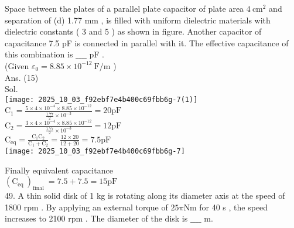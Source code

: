 \documentclass[10pt]{article}
\begin{document}
Space between the plates of a parallel plate capacitor of plate area \(4 \mathrm{~cm}^{2}\) and separation of (d) 1.77 mm , is filled with uniform dielectric materials with dielectric constants ( 3 and 5 ) as shown in figure. Another capacitor of capacitance 7.5 pF is connected in parallel with it. The effective capacitance of this combination is \(\_\_\_\_\) pF .\\
(Given \(\varepsilon_{0}=8.85 \times 10^{-12} \mathrm{~F} / \mathrm{m}\) )\\
Ans. (15)\\
Sol.\\
\texttt{[image: 2025\_10\_03\_f92ebf7e4b400c69fbb6g-7(1)]}\\
\(\mathrm{C}_{1}=\frac{5 \times 4 \times 10^{-4} \times 8.85 \times 10^{-12}}{\frac{1.77}{2} \times 10^{-3}}=20 \mathrm{pF}\)\\
\(\mathrm{C}_{2}=\frac{3 \times 4 \times 10^{-4} \times 8.85 \times 10^{-12}}{\frac{1.77}{2} \times 10^{-3}}=12 \mathrm{pF}\)\\
\(\mathrm{C}_{\mathrm{eq}}=\frac{\mathrm{C}_{1} \mathrm{C}_{2}}{\mathrm{C}_{1}+\mathrm{C}_{2}}=\frac{12 \times 20}{12+20}=7.5 \mathrm{pF}\)\\
\texttt{[image: 2025\_10\_03\_f92ebf7e4b400c69fbb6g-7]}

Finally equivalent capacitance\\
\(\left(\mathrm{C}_{\text {eq }}\right)_{\text {final }}=7.5+7.5=15 \mathrm{pF}\)\\
49. A thin solid disk of 1 kg is rotating along its diameter axis at the speed of 1800 rpm . By applying an external torque of \(25 \pi \mathrm{Nm}\) for 40 s , the speed increases to 2100 rpm . The diameter of the disk is \(\_\_\_\_\) m.
\end{document}
